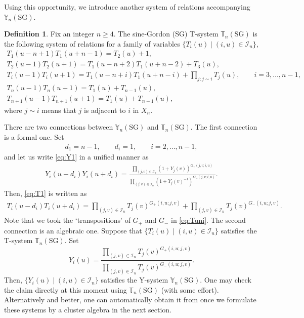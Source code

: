 \documentclass[pdftex]{sigma}
\numberwithin{equation}{section}
\theoremstyle{definition}
\newtheorem{Definition}[Theorem]{Definition}
\begin{document}
Using this opportunity, we introduce
another system of relations
 accompanying  $\mathbb{Y}_{n}(\mathrm{SG})$.
\begin{Definition}
Fix an integer $n \geq 4$.
The sine-Gordon (SG)
T-system $\mathbb{T}_{n}(\mathrm{SG})$
is the following system of relations for
a family of variables
 $\{T_i(u) \mid (i,u)\in \mathcal{I}_n \}$,
\begin{gather}
T_1\left(u-n+1\right)
T_1\left(u+n-1\right)
=
T_2(u)+1,\nonumber\\
T_2(u-1) T_2(u+1)
=
T_1(u-n+2)T_1(u+n-2)+T_3(u),
\nonumber\\
T_i(u-1)T_i(u+1)
=
T_1(u-n+i)T_1(u+n-i)
+ \prod_{j:j\sim i} T_j(u),
\qquad i=3,\dots,n-1,
\nonumber\\
T_{n}(u-1)T_{n}(u+1)
=
T_1(u) + T_{n-1}(u),
\nonumber\\
T_{n+1}(u-1)T_{n+1}(u+1)
=
T_1(u) + T_{n-1}(u),\label{eq:T1}
\end{gather}
where $j\sim i$ means that $j$ is adjacent to $i$ in $X_n$.
\end{Definition}

There are two connections between
$\mathbb{Y}_{n}(\mathrm{SG})$ and $\mathbb{T}_{n}(\mathrm{SG})$.
The f\/irst connection is a formal one.
Set
\begin{gather}
\label{eq:di}
d_1=n-1, \qquad d_i=1,\qquad i=2,\dots,n-1,
\end{gather}
and let us  write \eqref{eq:Y1}
in a unif\/ied manner as
\begin{gather}
\label{eq:Yuni}
Y_i\left(u-d_i\right)
Y_i\left(u+d_i\right)
=
\frac{
{\prod\limits_{(j,v)\in \mathcal{I}_{n}}
(1+Y_j(v))^{G_+(j,v;i,u)}
}
}
{\prod\limits_{(j,v)\in \mathcal{I}_{n}}
(1+Y_j(v)^{-1})^{G_-(j,v;i,u)}
}.
\end{gather}
Then, \eqref{eq:T1} is written as
\begin{gather}
\label{eq:Tuni}
T_i\left(u-d_i\right)
T_i\left(u+d_i\right)
=
\prod_{(j,v)\in \mathcal{I}_{n}}
T_j(v)^{G_+(i,u;j,v)}
+
\prod_{(j,v)\in \mathcal{I}_{n}}
T_j(v)^{G_-(i,u;j,v)}.
\end{gather}
Note that we took the `transpositions'
of $G_+$ and $G_-$ in \eqref{eq:Tuni}.
The second connection is an algebraic one.
Suppose that $\{ T_i(u) \mid (i,u)
\in \mathcal{I}_n\}$ satisf\/ies
the T-system $\mathbb{T}_n(\mathrm{SG})$.
Set
\[
Y_i(u)
=
\frac{\prod\limits_{(j,v)\in \mathcal{I}_{n}}
T_j(v)^{G_+(i,u;j,v)}
}
{\prod\limits_{(j,v)\in \mathcal{I}_{n}}
T_j(v)^{G_-(i,u;j,v)}}.
\]
Then, $\{ Y_i(u) \mid (i,u)
\in \mathcal{I}_n\}$ satisf\/ies
the Y-system $\mathbb{Y}_n(\mathrm{SG})$.
One may check the claim directly at this moment
using $\mathbb{T}_n(\mathrm{SG})$
(with some ef\/fort).
Alternatively and better, one can automatically obtain  it from
 \cite[Proposition 3.9]{Fomin07}
once we formulate these systems by a cluster algebra
in the next section.
\end{document}
